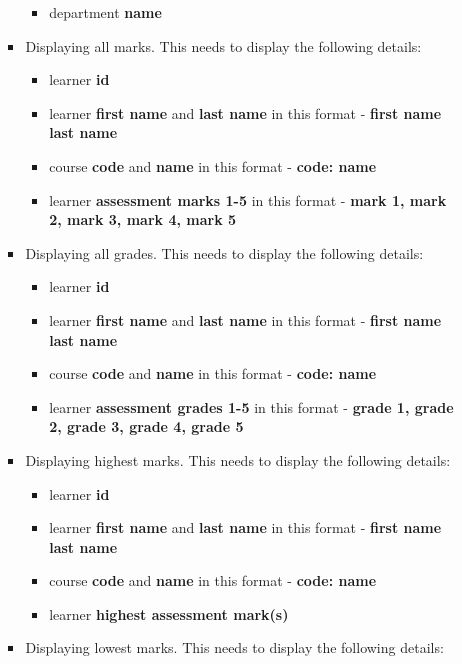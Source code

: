 \documentclass{article}
\begin{document}
\begin{itemize}
\begin{itemize}
\begin{itemize}
\begin{itemize}
                \item department \textbf{name}
            \end{itemize}
            \item Displaying all marks. This needs to display the following details:
            \begin{itemize}
                \item learner \textbf{id}
                \item learner \textbf{first name} and \textbf{last name} in this format - \textbf{first name last name}
                \item course \textbf{code} and \textbf{name} in this format - \textbf{code: name}
                \item learner \textbf{assessment marks 1-5} in this format - \textbf{mark 1, mark 2, mark 3, mark 4, mark 5}
            \end{itemize}
            \item Displaying all grades. This needs to display the following details:
            \begin{itemize}
                \item learner \textbf{id}
                \item learner \textbf{first name} and \textbf{last name} in this format - \textbf{first name last name}
                \item course \textbf{code} and \textbf{name} in this format - \textbf{code: name}
                \item learner  \textbf{assessment grades 1-5} in this format - \textbf{grade 1, grade 2, grade 3, grade 4, grade 5}
            \end{itemize}
            \item Displaying highest marks. This needs to display the following details:
            \begin{itemize}
                \item learner \textbf{id}
                \item learner \textbf{first name} and \textbf{last name} in this format - \textbf{first name last name}
                \item course \textbf{code} and \textbf{name} in this format - \textbf{code: name}
                \item learner \textbf{highest assessment mark(s)}
            \end{itemize}
            \item Displaying lowest marks. This needs to display the following details:

\end{itemize}
\end{itemize}
\end{itemize}
\end{document}
